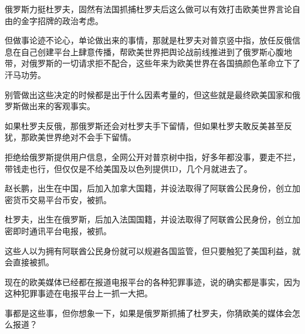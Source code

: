 \documentclass[UTF8,11pt,oneside]{ctexart}
\begin{document}
俄罗斯力挺杜罗夫，固然有法国抓捕杜罗夫后这么做可以有效打击欧美世界言论自由的金字招牌的政治考虑。

但做事论迹不论心，单论做出来的事情，那就是杜罗夫对普京竖中指，放任反俄信息在自己创建平台上肆意传播，帮欧美世界把舆论战前线推进到了俄罗斯心腹地带，对俄罗斯的一切请求拒不配合，这些年来为欧美世界在各国搞颜色革命立下了汗马功劳。


别管做出这些决定的时候都是出于什么因素考量的，但这些就是最终欧美国家和俄罗斯做出来的客观事实。




如果杜罗夫反俄，那俄罗斯还会对杜罗夫手下留情，但如果杜罗夫敢反美甚至反犹，那欧美世界绝对不会手下留情。

拒绝给俄罗斯提供用户信息，全网公开对普京树中指，好多年都没事，要走不拦，带钱走也行，但仅仅是不给美国及以色列提供ID，几个月就进去了。

赵长鹏，出生在中国，后加入加拿大国籍，并设法取得了阿联酋公民身份，创立加密货币交易平台币安，被抓。

杜罗夫，出生在俄罗斯，后加入法国国籍，并设法取得了阿联酋公民身份，创立加密即时通讯平台电报，被抓。

这些人以为拥有阿联酋公民身份就可以规避各国监管，但只要触犯了美国利益，就会直接被抓。


现在的欧美媒体已经都在报道电报平台的各种犯罪事迹，说的确实都是事实，因为这种犯罪事迹在电报平台上一抓一大把。

事都是这些事，但你想象一下，如果是俄罗斯抓捕了杜罗夫，你猜欧美的媒体会怎么报道？
\end{document}
